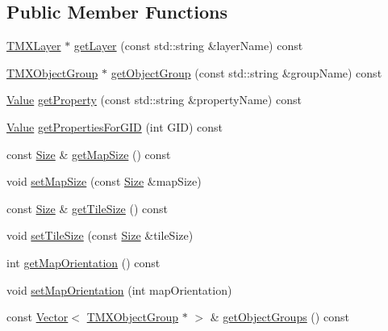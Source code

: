\subsection*{Public Member Functions}
\begin{DoxyCompactItemize}
\item 
\hyperlink{classexperimental_1_1TMXLayer}{T\+M\+X\+Layer} $\ast$ \hyperlink{classexperimental_1_1TMXTiledMap_aff957f2716dd1f06bd8ce54b173c43e1}{get\+Layer} (const std\+::string \&layer\+Name) const
\item 
\hyperlink{classTMXObjectGroup}{T\+M\+X\+Object\+Group} $\ast$ \hyperlink{classexperimental_1_1TMXTiledMap_a4addb02e0b8a56ab145b3a4162b4e6b8}{get\+Object\+Group} (const std\+::string \&group\+Name) const
\item 
\hyperlink{classValue}{Value} \hyperlink{classexperimental_1_1TMXTiledMap_a4628b8ea7514e6f12e292b68f8e808ae}{get\+Property} (const std\+::string \&property\+Name) const
\item 
\hyperlink{classValue}{Value} \hyperlink{classexperimental_1_1TMXTiledMap_a11c3215d6e74d03d30afc4c693e84d89}{get\+Properties\+For\+G\+ID} (int G\+ID) const
\item 
const \hyperlink{classSize}{Size} \& \hyperlink{classexperimental_1_1TMXTiledMap_a4c7f3f5487c6c8e8e597dfbba31e7659}{get\+Map\+Size} () const
\item 
void \hyperlink{classexperimental_1_1TMXTiledMap_a95bc2de4bdd3fe14b4559b81f16aab50}{set\+Map\+Size} (const \hyperlink{classSize}{Size} \&map\+Size)
\item 
const \hyperlink{classSize}{Size} \& \hyperlink{classexperimental_1_1TMXTiledMap_a4b40738cbf1cc2e30bef4e3dd1a8d3aa}{get\+Tile\+Size} () const
\item 
void \hyperlink{classexperimental_1_1TMXTiledMap_a8df9d7d1417094650d8bb83beae0ad18}{set\+Tile\+Size} (const \hyperlink{classSize}{Size} \&tile\+Size)
\item 
int \hyperlink{classexperimental_1_1TMXTiledMap_a2ef62c3afec1af3e4368c9123b28e53b}{get\+Map\+Orientation} () const
\item 
void \hyperlink{classexperimental_1_1TMXTiledMap_a051a7e04779c8f0bba62dc89dbe154d3}{set\+Map\+Orientation} (int map\+Orientation)
\item 
const \hyperlink{classVector}{Vector}$<$ \hyperlink{classTMXObjectGroup}{T\+M\+X\+Object\+Group} $\ast$ $>$ \& \hyperlink{classexperimental_1_1TMXTiledMap_a365b6b7cec1899006fa7dd22cb1d0914}{get\+Object\+Groups} () const
\item 

\end{DoxyCompactItemize}
